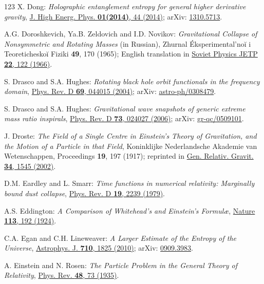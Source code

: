 \begin{thebibliography}{123}
X. Dong:
{\em Holographic entanglement entropy for general higher derivative gravity},
\href{https://doi.org/10.1007/JHEP01(2014)044}{J. High Energ. Phys. {\bf 01(2014)}, 44 (2014)};
arXiv: \href{https://arxiv.org/abs/1310.5713}{1310.5713}.

A.G. Doroshkevich, Ya.B. Zeldovich and I.D. Novikov:
{\em Gravitational Collapse of Nonsymmetric and Rotating Masses} (in Russian),
Zhurnal Éksperimental'noĭ i Teoreticheskoĭ Fiziki {\bf 49}, 170 (1965);
English translation in
\href{http://jetp.ras.ru/cgi-bin/e/index/e/22/1/p122?a=list}{Soviet Physics JETP {\bf 22}, 122 (1966)}.

S. Drasco and S.A. Hughes:
{\em Rotating black hole orbit functionals in the frequency domain},
\href{https://doi.org/10.1103/PhysRevD.69.044015}{Phys. Rev. D {\bf 69}, 044015 (2004)};
arXiv: \href{https://arxiv.org/abs/astro-ph/0308479}{astro-ph/0308479}.

S. Drasco and S.A. Hughes:
{\em Gravitational wave snapshots of generic extreme mass ratio inspirals},
\href{https://doi.org/10.1103/PhysRevD.73.024027}{Phys. Rev. D {\bf 73}, 024027 (2006)};
arXiv: \href{https://arxiv.org/abs/gr-qc/0509101}{gr-qc/0509101}.

J. Droste:
{\em The Field of a Single Centre in Einstein's Theory of Gravitation, and the Motion of a Particle in that Field},
Koninklijke Nederlandsche Akademie van Wetenschappen, Proceedings {\bf 19}, 197 (1917);
reprinted in \href{https://doi.org/10.1023/A:1020747322668}{Gen. Relativ. Gravit. {\bf 34}, 1545 (2002)}.

D.M. Eardley and L. Smarr:
{\em Time functions in numerical relativity: Marginally bound dust collapse},
\href{https://doi.org/10.1103/PhysRevD.19.2239}{Phys. Rev. D {\bf 19}, 2239 (1979)}.

A.S. Eddington: {\em A Comparison of Whitehead's and Einstein's Formul\ae},
\href{https://doi.org/10.1038/113192a0}{Nature {\bf 113}, 192 (1924)}.

C.A. Egan and C.H. Lineweaver:
{\em A Larger Estimate of the Entropy of the Universe},
\href{https://doi.org/10.1088/0004-637X/710/2/1825}{Astrophys. J. {\bf 710}, 1825 (2010)};
arXiv: \href{https://arxiv.org/abs/0909.3983}{0909.3983}.

A. Einstein and N. Rosen:
{\em The Particle Problem in the General Theory of Relativity},
\href{https://doi.org/10.1103/PhysRev.48.73}{Phys. Rev. {\bf 48}, 73 (1935)}.


\end{thebibliography}

